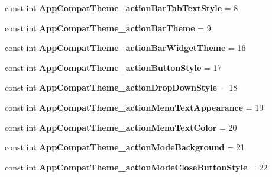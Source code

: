 \begin{DoxyCompactItemize}
const int {\bfseries App\+Compat\+Theme\+\_\+action\+Bar\+Tab\+Text\+Style} = 8
\item 
\mbox{\label{classst_delivery_1_1_resource_1_1_styleable_a59c578cfe58b99bdf744ecdb061a6d2f}} 
const int {\bfseries App\+Compat\+Theme\+\_\+action\+Bar\+Theme} = 9
\item 
\mbox{\label{classst_delivery_1_1_resource_1_1_styleable_a696561f0f044e83f5bab8cb0015a6fe9}} 
const int {\bfseries App\+Compat\+Theme\+\_\+action\+Bar\+Widget\+Theme} = 16
\item 
\mbox{\label{classst_delivery_1_1_resource_1_1_styleable_a0beb261716b46687a4cf2bedf7e23f88}} 
const int {\bfseries App\+Compat\+Theme\+\_\+action\+Button\+Style} = 17
\item 
\mbox{\label{classst_delivery_1_1_resource_1_1_styleable_a089cc8d1937671fcbc99b0537abb4b9e}} 
const int {\bfseries App\+Compat\+Theme\+\_\+action\+Drop\+Down\+Style} = 18
\item 
\mbox{\label{classst_delivery_1_1_resource_1_1_styleable_adffc5b2d748fb29181ebb24f007f05a2}} 
const int {\bfseries App\+Compat\+Theme\+\_\+action\+Menu\+Text\+Appearance} = 19
\item 
\mbox{\label{classst_delivery_1_1_resource_1_1_styleable_a5ddc1096e087bd42aa87a510bc7c6b70}} 
const int {\bfseries App\+Compat\+Theme\+\_\+action\+Menu\+Text\+Color} = 20
\item 
\mbox{\label{classst_delivery_1_1_resource_1_1_styleable_ae09fa1039a44cc3dd15f2c580ede8138}} 
const int {\bfseries App\+Compat\+Theme\+\_\+action\+Mode\+Background} = 21
\item 
\mbox{\label{classst_delivery_1_1_resource_1_1_styleable_a63262ab1eb5683f63a6efdac424d5548}} 
const int {\bfseries App\+Compat\+Theme\+\_\+action\+Mode\+Close\+Button\+Style} = 22
\item 

\end{DoxyCompactItemize}
